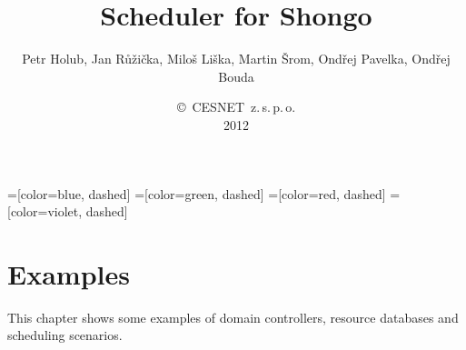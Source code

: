 \documentclass[a4paper]{report}
\begin{document}
\title{Scheduler for Shongo}
\author{Petr Holub, Jan Růžička, Miloš Liška, Martin Šrom, Ondřej Pavelka, 
        Ondřej Bouda}
\date{\copyright~CESNET~z.\,s.\,p.\,o.\\2012}
\maketitle
\tableofcontents

=[color=blue, dashed]
=[color=green, dashed]
=[color=red, dashed]
=[color=violet, dashed]







\chapter{Examples}

This chapter shows some examples of domain controllers, resource databases and scheduling scenarios.



\end{document}
